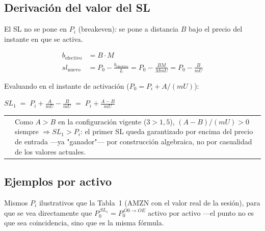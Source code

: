 \documentclass[11pt,a4paper]{article}
\makeatletter
\newenvironment{nota}{%
  \par\medskip\noindent
  \begin{tabular}{@{}p{0.4em}@{\hspace{8pt}}p{\dimexpr\linewidth-2em\relax}@{}}
  \textcolor{cnaranja}{\rule{3pt}{1.1em}} &
}{\end{tabular}\par\medskip}
\makeatother
\begin{document}
\subsection{Derivación del valor del SL}

El SL no se pone en $P_i$ (breakeven): se pone a distancia $B$ bajo el precio del
instante en que se activa.

\begin{align}
b_{\text{efectivo}} &= B \cdot M \\
sl_{\text{nuevo}} &= P_0 - \frac{b_{\text{efectivo}}}{L} = P_0 - \frac{BM}{MmU} = P_0 - \frac{B}{mU}
\end{align}

Evaluando en el instante de activación ($P_0 = P_i + A/(mU)$):

\begin{center}
\colorbox{cfondo}{$\displaystyle SL_1 \;=\; P_i + \frac{A}{mU} - \frac{B}{mU} \;=\; P_i + \frac{A-B}{mU}$}
\end{center}

\begin{nota}
Como $A > B$ en la configuración vigente ($3 > 1{,}5$), $(A-B)/(mU) > 0$ siempre
$\Rightarrow SL_1 > P_i$: el primer SL queda garantizado por encima del precio de
entrada —ya "ganador"— por construcción algebraica, no por casualidad de los valores
actuales.
\end{nota}

\subsection{Ejemplos por activo}

Mismos $P_i$ ilustrativos que la Tabla~1 (AMZN con el valor real de la sesión), para
que se vea directamente que $P_0^{\,SL_1} = P_0^{\,O0\to OE}$ activo por activo —el
punto no es que sea coincidencia, sino que es la misma fórmula.
\end{document}

